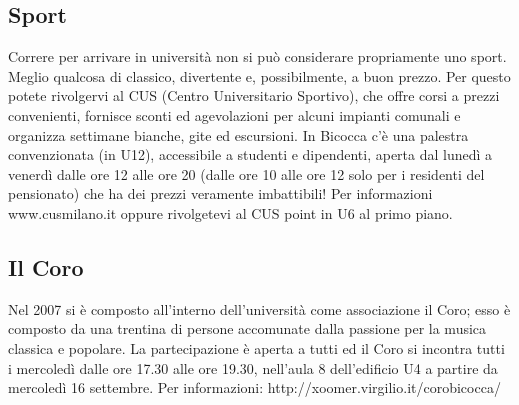 \subsection{Sport}
Correre per arrivare in università non si può considerare propriamente uno sport. Meglio qualcosa di classico, divertente e, possibilmente, a buon prezzo. Per questo potete rivolgervi al CUS (Centro Universitario Sportivo), che offre corsi a prezzi convenienti, fornisce sconti ed agevolazioni per alcuni impianti comunali e organizza settimane bianche, gite ed escursioni. In Bicocca c'è una palestra convenzionata (in U12), accessibile a studenti e dipendenti,  aperta dal lunedì a venerdì dalle ore 12 alle ore 20 (dalle ore 10 alle ore 12 solo per i residenti del pensionato) che ha dei prezzi veramente imbattibili! Per informazioni www.cusmilano.it oppure rivolgetevi al CUS point in U6 al primo piano. 

\subsection{Il Coro}
Nel 2007 si è composto all'interno dell'università come associazione il Coro; esso è composto da una trentina di persone accomunate dalla passione per la musica classica e popolare. La partecipazione è aperta a tutti ed il Coro si incontra tutti i mercoledì dalle ore 17.30 alle ore 19.30, nell'aula 8 dell'edificio U4 a partire da mercoledì 16 settembre. Per informazioni: http://xoomer.virgilio.it/corobicocca/

